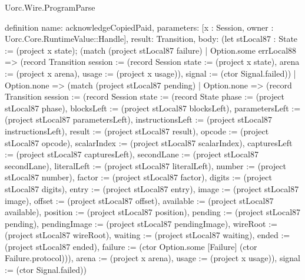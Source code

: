 \begin{lexlean}{Uorc.Wire.ProgramParse}
\begin{semanticmodule}
definition{
  name: acknowledgeCopiedPaid,
  parameters: [x : Session, owner : Uorc.Core.RuntimeValue::Handle],
  result: Transition,
  body: (let stLocal87 : State := (project x state); (match (project stLocal87 failure)
    | Option.some errLocal88 => (record Transition {session := (record Session {state := (project x state), arena := (project x arena), usage := (project x usage)}), signal := (ctor Signal.failed)})
    | Option.none => (match (project stLocal87 pending)
      | Option.none => (record Transition {session := (record Session {state := (record State {phase := (project stLocal87 phase), blocksLeft := (project stLocal87 blocksLeft), parametersLeft := (project stLocal87 parametersLeft), instructionsLeft := (project stLocal87 instructionsLeft), result := (project stLocal87 result), opcode := (project stLocal87 opcode), scalarIndex := (project stLocal87 scalarIndex), capturesLeft := (project stLocal87 capturesLeft), secondLane := (project stLocal87 secondLane), literalLeft := (project stLocal87 literalLeft), number := (project stLocal87 number), factor := (project stLocal87 factor), digits := (project stLocal87 digits), entry := (project stLocal87 entry), image := (project stLocal87 image), offset := (project stLocal87 offset), available := (project stLocal87 available), position := (project stLocal87 position), pending := (project stLocal87 pending), pendingImage := (project stLocal87 pendingImage), wireRoot := (project stLocal87 wireRoot), waiting := (project stLocal87 waiting), ended := (project stLocal87 ended), failure := (ctor Option.some [Failure] (ctor Failure.protocol))}), arena := (project x arena), usage := (project x usage)}), signal := (ctor Signal.failed)})
}
\end{semanticmodule}
\end{lexlean}
